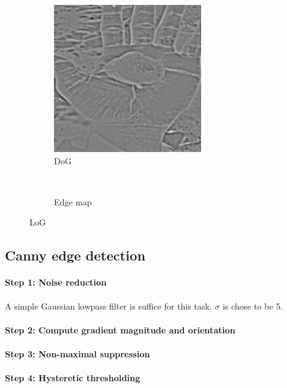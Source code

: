 \documentclass[12pt]{article}
\begin{document}
\begin{figure}[H]
    \centering
    \begin{subfigure}[t]{0.5\textwidth}
        \centering
        \includegraphics[height=2.5in]{images/dog_grad}
        \caption{DoG}
    \end{subfigure}%
    ~
    \begin{subfigure}[t]{0.5\textwidth}
        \centering
        \caption{Edge map}
    \end{subfigure}
    \caption{LoG}
    \label{fig:dog}
\end{figure}

\subsection*{Canny edge detection}
\paragraph*{Step 1: Noise reduction}
A simple Gaussian lowpass filter is suffice for this task. $\sigma$ is chose to be 5.

\paragraph*{Step 2: Compute gradient magnitude and orientation}

\paragraph*{Step 3: Non-maximal suppression}

\paragraph*{Step 4: Hysteretic thresholding}
\end{document}
